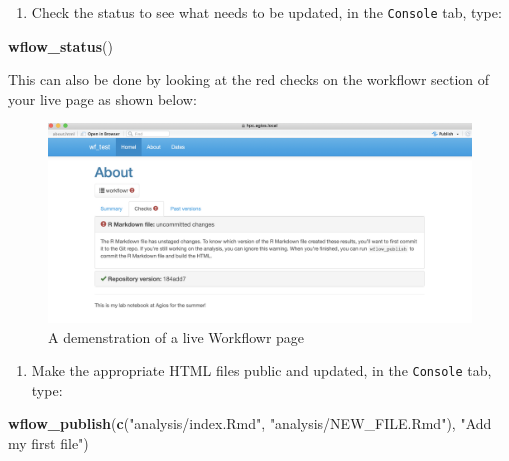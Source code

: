 \documentclass[openany]{article}
\newenvironment{Shaded}{\begin{snugshade}}{\end{snugshade}}
\newcommand{\KeywordTok}[1]{\textcolor[rgb]{0.13,0.29,0.53}{\textbf{#1}}}
\newcommand{\NormalTok}[1]{#1}
\newcommand{\StringTok}[1]{\textcolor[rgb]{0.31,0.60,0.02}{#1}}
\providecommand{\tightlist}{%
  \setlength{\itemsep}{0pt}\setlength{\parskip}{0pt}}
\begin{document}
\begin{enumerate}
\def\labelenumi{\arabic{enumi}.}
\tightlist
\item
  Check the status to see what needs to be updated, in the \texttt{Console} tab, type:
\end{enumerate}

\begin{Shaded}
\begin{Highlighting}[]
\KeywordTok{wflow_status}\NormalTok{()}
\end{Highlighting}
\end{Shaded}

This can also be done by looking at the red checks on the workflowr section of your live page as shown below:

\begin{figure}

{\centering \includegraphics[width=0.9\linewidth]{images/Workflow_Photos/red_checks} 

}

\caption{A demenstration of a live Workflowr page}\label{fig:d4}
\end{figure}

\begin{enumerate}
\def\labelenumi{\arabic{enumi}.}
\setcounter{enumi}{1}
\tightlist
\item
  Make the appropriate HTML files public and updated, in the \texttt{Console} tab, type:
\end{enumerate}

\begin{Shaded}
\begin{Highlighting}[]
\KeywordTok{wflow_publish}\NormalTok{(}\KeywordTok{c}\NormalTok{(}\StringTok{"analysis/index.Rmd"}\NormalTok{, }
    \StringTok{"analysis/NEW_FILE.Rmd"}\NormalTok{), }\StringTok{"Add my first file"}\NormalTok{)}
\end{Highlighting}
\end{Shaded}
\end{document}

